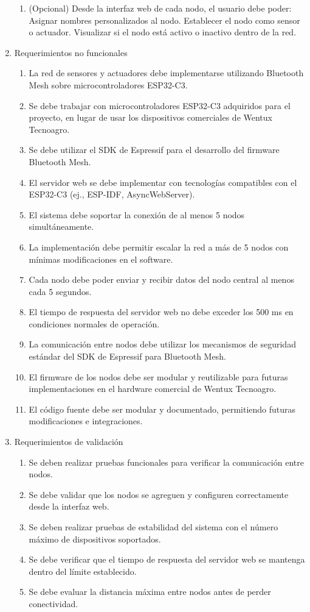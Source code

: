 \documentclass[
11pt, %
]{charter}
\begin{document}
\begin{enumerate}
\begin{enumerate}
		\item (Opcional) Desde la interfaz web de cada nodo, el usuario debe poder:
		\subitem Asignar nombres personalizados al nodo.
		\subitem Establecer el nodo como sensor o actuador.
		\subitem Visualizar si el nodo está activo o inactivo dentro de la red.
	\end{enumerate}
	
\item Requerimientos no funcionales
	\begin{enumerate}
		\item La red de sensores y actuadores debe implementarse utilizando Bluetooth Mesh sobre microcontroladores ESP32-C3.
		\item Se debe trabajar con microcontroladores ESP32-C3 adquiridos para el proyecto, en lugar de usar los dispositivos comerciales de Wentux Tecnoagro.
		\item Se debe utilizar el SDK de Espressif para el desarrollo del firmware Bluetooth Mesh.
		\item El servidor web se debe implementar con tecnologías compatibles con el ESP32-C3 (ej., ESP-IDF, AsyncWebServer).
		\item El sistema debe soportar la conexión de al menos 5 nodos simultáneamente.
		\item La implementación debe permitir escalar la red a más de 5 nodos con mínimas modificaciones en el software.
		\item Cada nodo debe poder enviar y recibir datos del nodo central al menos cada 5 segundos.		
		\item El tiempo de respuesta del servidor web no debe exceder los 500 ms en condiciones normales de operación.
		\item La comunicación entre nodos debe utilizar los mecanismos de seguridad estándar del SDK de Espressif para Bluetooth Mesh.
		\item El firmware de los nodos debe ser modular y reutilizable para futuras implementaciones en el hardware comercial de Wentux Tecnoagro.
		\item El código fuente debe ser modular y documentado, permitiendo futuras modificaciones e integraciones.
	\end{enumerate}
	
\item Requerimientos de validación
	\begin{enumerate}
		\item Se deben realizar pruebas funcionales para verificar la comunicación entre nodos.
		\item Se debe validar que los nodos se agreguen y configuren correctamente desde la interfaz web.
		\item Se deben realizar pruebas de estabilidad del sistema con el número máximo de dispositivos soportados.
		\item Se debe verificar que el tiempo de respuesta del servidor web se mantenga dentro del límite establecido.
		\item Se debe evaluar la distancia máxima entre nodos antes de perder conectividad.
	\end{enumerate}


\end{enumerate}
\end{document}
